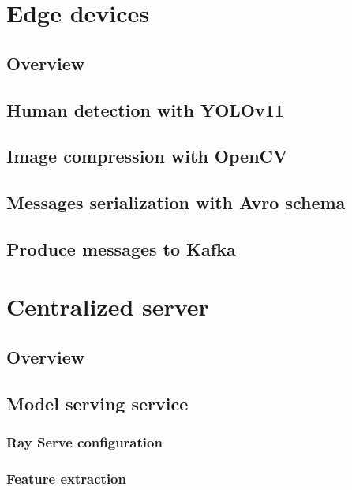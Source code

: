 \documentclass[../main.tex]{subfiles}
\begin{document}
\section{Edge devices}
\label{sec:edge_devices}

\subsection{Overview}

\subsection{Human detection with YOLOv11}

\subsection{Image compression with OpenCV}

\subsection{Messages serialization with Avro schema}

\subsection{Produce messages to Kafka}

\section{Centralized server}
\label{sec:centralized_server}

\subsection{Overview}

\subsection{Model serving service}

    \subsubsection{Ray Serve configuration}

    \subsubsection{Feature extraction}
\end{document}
